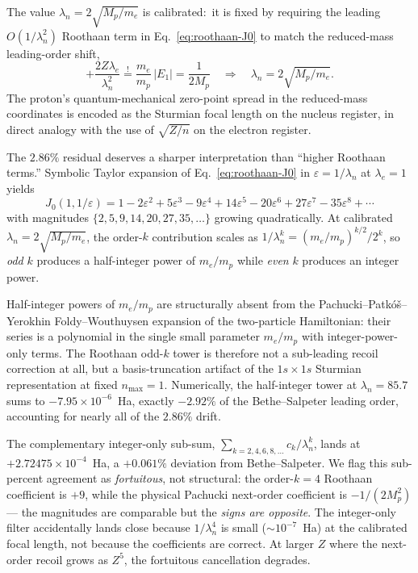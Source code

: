 \documentclass[twocolumn,prc,amsmath,amssymb,superscriptaddress]{revtex4-2}
\begin{document}
The value $\lambda_n = 2\sqrt{M_p/m_e}$ is calibrated:\ it is fixed by
requiring the leading
$O(1/\lambda_n^2)$ Roothaan term in Eq.~\eqref{eq:roothaan-J0} to match
the reduced-mass leading-order shift,
\[
  +\frac{2 Z \lambda_e}{\lambda_n^2}
  \stackrel{!}{=} \frac{m_e}{m_p}\, |E_1|
  = \frac{1}{2 M_p}\quad
  \Longrightarrow\quad
  \lambda_n = 2\sqrt{M_p / m_e}.
\]
The proton's quantum-mechanical zero-point spread in the reduced-mass
coordinates is encoded as the Sturmian focal length on the nucleus
register, in direct analogy with the use of $\sqrt{Z/n}$ on the electron
register.

The $2.86\%$ residual deserves a sharper interpretation than ``higher
Roothaan terms.'' Symbolic Taylor expansion of Eq.~\eqref{eq:roothaan-J0}
in $\varepsilon = 1/\lambda_n$ at $\lambda_e = 1$ yields
\begin{equation}
  J_0(1, 1/\varepsilon)
  = 1 - 2\varepsilon^2 + 5\varepsilon^3 - 9\varepsilon^4
    + 14\varepsilon^5 - 20\varepsilon^6 + 27\varepsilon^7
    - 35\varepsilon^8 + \cdots
\label{eq:roothaan-taylor}
\end{equation}
with magnitudes $\{2, 5, 9, 14, 20, 27, 35, \ldots\}$ growing
quadratically. At calibrated $\lambda_n = 2\sqrt{M_p / m_e}$, the
order-$k$ contribution scales as $1/\lambda_n^k = (m_e/m_p)^{k/2}/2^k$,
so \emph{odd} $k$ produces a half-integer power of $m_e/m_p$ while
\emph{even} $k$ produces an integer power.

Half-integer powers of $m_e/m_p$ are structurally absent from the
Pachucki--Patkó\v{s}--Yerokhin Foldy--Wouthuysen expansion of the
two-particle Hamiltonian: their series is a polynomial in the single
small parameter $m_e/m_p$ with integer-power-only terms. The Roothaan
odd-$k$ tower is therefore not a sub-leading recoil correction at all,
but a basis-truncation artifact of the $1s \times 1s$ Sturmian
representation at fixed $n_{\max} = 1$. Numerically, the half-integer
tower at $\lambda_n = 85.7$ sums to $-7.95 \times 10^{-6}$~Ha,
exactly $-2.92\%$ of the Bethe--Salpeter leading order, accounting
for nearly all of the $2.86\%$ drift.

The complementary integer-only sub-sum,
$\sum_{k = 2,4,6,8,\ldots} c_k / \lambda_n^k$, lands at
$+2.72475 \times 10^{-4}$~Ha, a $+0.061\%$ deviation from
Bethe--Salpeter. We flag this sub-percent agreement as
\emph{fortuitous}, not structural: the order-$k=4$ Roothaan
coefficient is $+9$, while the physical Pachucki next-order
coefficient is $-1/(2 M_p^2)$ --- the magnitudes are comparable but
the \emph{signs are opposite}. The integer-only filter accidentally
lands close because $1/\lambda_n^4$ is small ($\sim 10^{-7}$~Ha) at
the calibrated focal length, not because the coefficients are
correct. At larger $Z$ where the next-order recoil grows as $Z^5$,
the fortuitous cancellation degrades.
\end{document}
